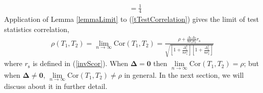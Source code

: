 \documentclass[12pt, a4paper]{article}
\begin{document}
\begin{appendix}
\begin{align*}
			&= \frac{1}{4}
			\end{align*}
			Application of Lemma \ref{lemmaLimit} to (\ref{tTestCorrelation}) gives the limit of test statistics
			correlation, 
			\begin{align}\label{llimitT}
			\rho(T_1, T_2)=\lim\limits_{n \rightarrow \infty} \text{Cor}(T_1, T_2) = \frac{\rho +
				\frac{\Delta_1\Delta_2}{8\sigma_1\sigma_2}r_{\text{s}}}{\sqrt{  \left[ 1 +
					\frac{\Delta_1^2}{8\sigma_1^2}\right]\left[ 1 + \frac{\Delta_2^2}{8\sigma_2^2}\right]}}
			\end{align}
			where $r_{\text{s}}$ is defined in (\ref{invScor}). When $\bm \Delta = \bm 0$ then $\lim\limits_{n
				\rightarrow \infty} \text{Cor}(T_1, T_2) = \rho$; but when $\bm \Delta \neq \bm 0$, $\lim\limits_{n
				\rightarrow \infty} \text{Cor}(T_1, T_2) \neq \rho$ in general. In the next section, we will discuss
			about it in further detail. 
			
		
		
		\newpage
		
	\end{appendix}
	
	
	
\end{document}
